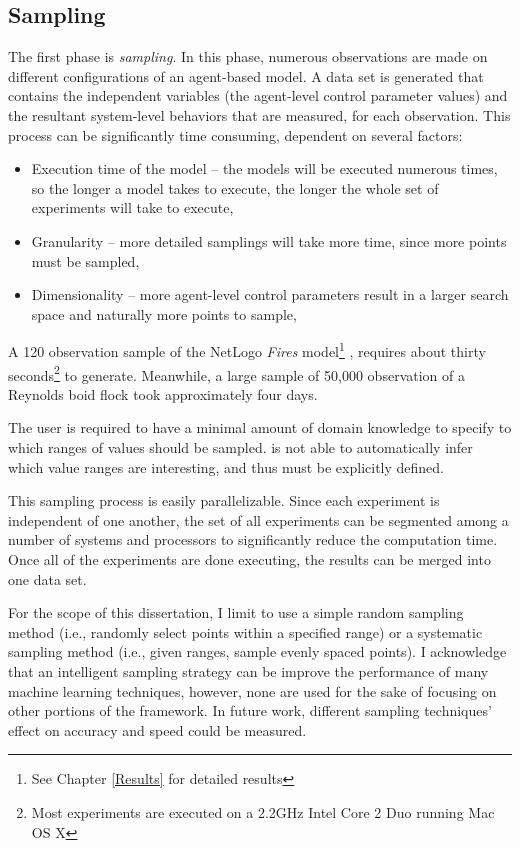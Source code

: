 \subsection{Sampling}
The first phase is \textit{sampling}.
In this phase, numerous observations are made on different configurations of an agent-based model.
A data set is generated that contains the independent variables (the agent-level control parameter values) and the resultant system-level behaviors that are measured, for each observation.
This process can be significantly time consuming, dependent on several factors:
\begin{itemize}
  \item Execution time of the model -- the models will be executed numerous times, so the longer a model takes to execute, the longer the whole set of experiments will take to execute,
  \item Granularity -- more detailed samplings will take more time, since more points must be sampled,
  \item Dimensionality -- more agent-level control parameters result in a larger search space and naturally more points to sample,
\end{itemize}
A 120 observation sample of the NetLogo \textit{Fires} model\footnote{See Chapter \ref{Results} for detailed results} \cite{fires}, requires about thirty seconds\footnote{Most experiments are executed on a 2.2GHz Intel Core 2 Duo running Mac OS X} to generate.
Meanwhile, a large sample of 50,000 observation of a Reynolds boid flock \cite{reynolds1987} took approximately four days.

The user is required to have a minimal amount of domain knowledge to specify to \fw which  ranges of values should be sampled.
\fw is not able to automatically infer which value ranges are interesting, and thus must be explicitly defined.

This sampling process is easily parallelizable.
Since each experiment is independent of one another, the set of all experiments can be segmented among a number of systems and processors to significantly reduce the computation time.
Once all of the experiments are done executing, the results can be merged into one data set.

For the scope of this dissertation, I limit \fw to use a simple random sampling method (i.e., randomly select points within a specified range) or a systematic sampling method (i.e., given ranges, sample evenly spaced points).
I acknowledge that an intelligent sampling strategy can be improve the performance of many machine learning techniques, however, none are used for the sake of focusing on other portions of the framework.
In future work, different sampling techniques' effect on accuracy and speed could be measured.



